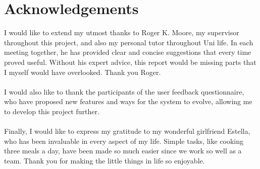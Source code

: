 \chapter*{\Large \centering Acknowledgements}
I would like to extend my utmost thanks to Roger K. Moore, my supervisor throughout this project, and also my personal tutor throughout Uni life. In each meeting together, he has provided clear and concise suggestions that every time proved useful. Without his expert advice, this report would be missing parts that I myself would have overlooked. Thank you Roger.
\\\\
I would also like to thank the participants of the user feedback questionnaire, who have proposed new features and ways for the system to evolve, allowing me to develop this project further. 
\\\\
Finally, I would like to express my gratitude to my wonderful girlfriend Estella, who has been invaluable in every aspect of my life. Simple tasks, like cooking three meals a day, have been made so much easier since we work so well as a team. Thank you for making the little things in life so enjoyable.